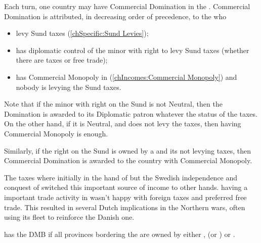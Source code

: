 

 Each turn, one
country may have Commercial Domination in the
. Commercial Domination is attributed, in decreasing
order of precedence, to the \MAJ who
\begin{itemize}
\item levy Sund taxes (\ref{chSpecific:Sund Levies});
\item has diplomatic control of the minor with right to levy Sund taxes
  (whether there are taxes or free trade);
\item has Commercial Monopoly in 
  (\ref{chIncomes:Commercial Monopoly}) and nobody is levying the Sund
  taxes.
\end{itemize}

\begin{designnote}
  Note that if the minor with right on the Sund is not Neutral, then the
  Domination is awarded to its Diplomatic patron whatever the status of
  the taxes. On the other hand, if it is Neutral, and does not levy the
  taxes, then having Commercial Monopoly is enough.

  Similarly, if the right on the Sund is owned by a \MAJ and its not
  levying taxes, then Commercial Domination is awarded to the country
  with Commercial Monopoly.
\end{designnote}

\begin{histoire}
  The taxes where initially in the hand of \paysDanemark but the Swedish
  independence and conquest of \provinceSkane switched this important
  source of income to other hands. \HOL having a important trade
  activity in  wasn't happy with foreign taxes and
  preferred free trade. This resulted in several Dutch implications in
  the Northern wars, often using its fleet to reinforce the Danish one.
\end{histoire}

 \SUE has the DMB if all provinces
bordering the are owned by either \SUE,
 (or \PRU) or .


